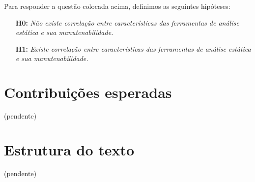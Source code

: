 Para responder a questão colocada acima, definimos as seguintes hipóteses:

\begin{enumerate}
  \item[{\bf H0:}] {\em Não existe correlação entre características das
  ferramentas de análise estática e sua manutenabilidade.}
  \item[{\bf H1:}] {\em Existe correlação entre características das ferramentas
  de análise estática e sua manutenabilidade.}
\end{enumerate}

\section{Contribuições esperadas}

(pendente)

%

\section{Estrutura do texto} 

(pendente)

